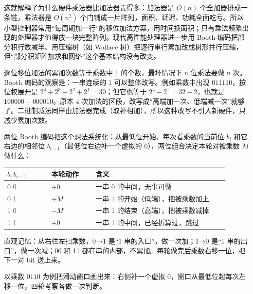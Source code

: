 这就解释了为什么硬件乘法器比加法器贵得多：加法器是 $O(n)$ 个全加器排成一条链，乘法器是 $O(n^2)$ 个门铺成一片阵列，面积、延迟、功耗全面吃亏。所以小型控制器常用“每周期加一行”的移位加法方案，用时间换面积；只有乘法频繁出现的处理器才值得放一块完整阵列。现代高性能处理器进一步用 Booth 编码把部分积行数减半、用压缩树（如 Wallace 树）把逐行串行累加改成树形并行压缩，但“部分积矩阵加求和网络”这个基本结构没有改变。


逐位移位加法的累加次数等于乘数中 1 的个数，最坏情况下 n 位乘法要做 n 次。Booth 编码的观察是：一串连续的 1 可以整体改写。例如乘数中出现 $011110$，按位权展开是 $2^4+2^3+2^2+2^1=30$；但它也等于 $2^5-2^1=32-2$，也就是 $100000-000010$。原本 4 次加法的区段，改写成“高端加一次、低端减一次”就够了。二进制减法同样由加法器完成（取补相加），所以这种改写不引入新硬件，只减少累加次数。

两位 Booth 编码把这个想法系统化：从最低位开始，每次看乘数的当前位 $b_i$ 和它右边的相邻位 $b_{i-1}$（最低位右边补一个虚拟的 0），两位组合决定本轮对被乘数 $M$ 做什么：

\begin{longtable}{L{0.18\linewidth}L{0.18\linewidth}L{0.54\linewidth}}
\toprule
$b_i\,b_{i-1}$ & 本轮动作 & 含义 \\
 0 & $+0$ & 一串 0 的中间，无事可做 \\
0 1 & $+M$ & 一串 1 的开始（低端），把被乘数加上 \\
1 0 & $-M$ & 一串 1 的结束（高端），把被乘数减掉 \\
1 1 & $+0$ & 一串 1 的中间，已经折算过，跳过 \\
\bottomrule
\end{longtable}

直观记忆：从右往左扫乘数，0→1 是“1 串的入口”，做一次加；1→0 是“1 串的出口”，做一次减；00 和 11 都在串的内部，不累加。每轮做完后乘数右移一位，把下一对 bit 送上来。

以乘数 $0110$ 为例把滑动窗口画出来：右侧补一个虚拟 0，窗口从最低位起每次左移一位，四轮考察各做一次判断。

